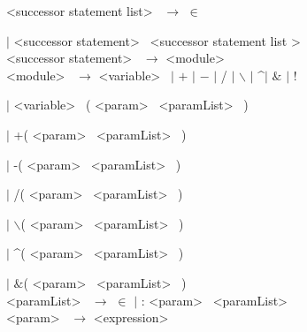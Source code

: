 \noindent
\textless successor statement list\textgreater~ $\rightarrow$ $\in$

\hspace{2cm} $|$ \textless successor statement\textgreater~ \textless successor statement list \textgreater~ \\


\noindent
\textless successor statement\textgreater~ $\rightarrow$ \textless module\textgreater~ \\



\noindent
\textless module\textgreater~ $\rightarrow$  \textless variable\textgreater~ $|$ $+$ $|$ $-$ $|$ / $|$ $\backslash$ $|$ \textasciicircum $|$ $\&$ $|$ ! 

\hspace{2cm} $|$ \textless variable\textgreater~ (  \textless param\textgreater~ \textless paramList\textgreater~ )

\hspace{2cm} $|$ +(  \textless param\textgreater~ \textless paramList\textgreater~ )

\hspace{2cm} $|$ -(  \textless param\textgreater~ \textless paramList\textgreater~ )

\hspace{2cm} $|$ /(  \textless param\textgreater~ \textless paramList\textgreater~ ) 

\hspace{2cm} $|$ $\backslash$(  \textless param\textgreater~ \textless paramList\textgreater~ ) 

\hspace{2cm} $|$ \textasciicircum (  \textless param\textgreater~ \textless paramList\textgreater~ ) 

\hspace{2cm} $|$ $\&$(  \textless param\textgreater~ \textless paramList\textgreater~ ) \\



\noindent
\textless paramList\textgreater~ $\rightarrow$ $\in$ $|$ : \textless param\textgreater~ \textless paramList\textgreater~ \\



\noindent
\textless param\textgreater~ $\rightarrow$ \textless expression\textgreater~ \\



